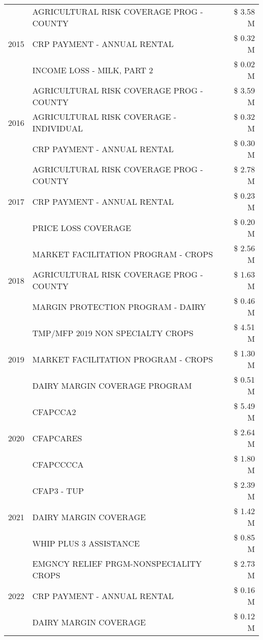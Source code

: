 \begin{tabular}{llr}
\cline{1-3}
\multirow[t]{3}{*}{2015} & AGRICULTURAL RISK COVERAGE PROG - COUNTY & \$ 3.58 M \\
 & CRP PAYMENT - ANNUAL RENTAL & \$ 0.32 M \\
 & INCOME LOSS - MILK, PART 2 & \$ 0.02 M \\
\cline{1-3}
\multirow[t]{3}{*}{2016} & AGRICULTURAL RISK COVERAGE PROG - COUNTY & \$ 3.59 M \\
 & AGRICULTURAL RISK COVERAGE - INDIVIDUAL & \$ 0.32 M \\
 & CRP PAYMENT - ANNUAL RENTAL & \$ 0.30 M \\
\cline{1-3}
\multirow[t]{3}{*}{2017} & AGRICULTURAL RISK COVERAGE PROG - COUNTY & \$ 2.78 M \\
 & CRP PAYMENT - ANNUAL RENTAL & \$ 0.23 M \\
 & PRICE LOSS COVERAGE & \$ 0.20 M \\
\cline{1-3}
\multirow[t]{3}{*}{2018} & MARKET FACILITATION PROGRAM - CROPS & \$ 2.56 M \\
 & AGRICULTURAL RISK COVERAGE PROG - COUNTY & \$ 1.63 M \\
 & MARGIN PROTECTION PROGRAM - DAIRY & \$ 0.46 M \\
\cline{1-3}
\multirow[t]{3}{*}{2019} & TMP/MFP 2019 NON SPECIALTY CROPS & \$ 4.51 M \\
 & MARKET FACILITATION PROGRAM - CROPS & \$ 1.30 M \\
 & DAIRY MARGIN COVERAGE PROGRAM & \$ 0.51 M \\
\cline{1-3}
\multirow[t]{3}{*}{2020} & CFAPCCA2 & \$ 5.49 M \\
 & CFAPCARES & \$ 2.64 M \\
 & CFAPCCCCA & \$ 1.80 M \\
\cline{1-3}
\multirow[t]{3}{*}{2021} & CFAP3 - TUP & \$ 2.39 M \\
 & DAIRY MARGIN COVERAGE & \$ 1.42 M \\
 & WHIP PLUS 3 ASSISTANCE & \$ 0.85 M \\
\cline{1-3}
\multirow[t]{3}{*}{2022} & EMGNCY RELIEF PRGM-NONSPECIALITY CROPS & \$ 2.73 M \\
 & CRP PAYMENT - ANNUAL RENTAL & \$ 0.16 M \\
 & DAIRY MARGIN COVERAGE & \$ 0.12 M \\
\cline{1-3}
\bottomrule
\end{tabular}
